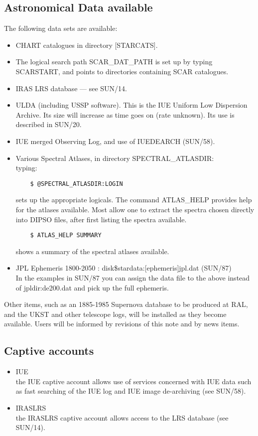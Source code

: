 \subsection{Astronomical Data available}

The following data sets are available:
\begin{itemize}
\item CHART catalogues in directory [STARCATS].
\item The logical search path SCAR\_DAT\_PATH is set up by typing
SCARSTART, and points to directories containing SCAR catalogues.
\item IRAS LRS database --- see SUN/14.
\item ULDA (including USSP software).
This is the IUE Uniform Low Dispersion Archive.
Its size will increase as time goes on (rate unknown).
Its use is described in SUN/20.
\item IUE merged Observing Log, and use of IUEDEARCH (SUN/58).
\item Various Spectral Atlases, in directory SPECTRAL\_ATLASDIR:\\
      typing:
\begin{verbatim}
    $ @SPECTRAL_ATLASDIR:LOGIN
\end{verbatim}
sets up the appropriate logicals. The command ATLAS\_HELP provides help for
the atlases available. Most allow one to extract the spectra chosen directly
into DIPSO files,  after first listing the spectra available.
\begin{verbatim}
    $ ATLAS_HELP SUMMARY
\end{verbatim}
shows a summary of the spectral atlases available.
\item    JPL Ephemeris 1800-2050  : disk\$stardata:[ephemeris]jpl.dat (SUN/87)\\
         In the examples in SUN/87 you can assign the data file to the
         above instead of jpldir:de200.dat and pick up the full ephemeris.
\end{itemize}
Other items, such as an 1885-1985 Supernova database to be produced at RAL, and
the UKST and other telescope logs, will be installed as they become available.
Users will be informed by revisions of this note and by news items.

\subsection{Captive accounts}

\begin{itemize}

\item IUE \\
the IUE captive account allows use of services
concerned with IUE data such as fast searching of the IUE log
and IUE image de-archiving (see SUN/58).
\item IRASLRS\\
the IRASLRS captive account allows access to the LRS database (see SUN/14).
\end{itemize}


